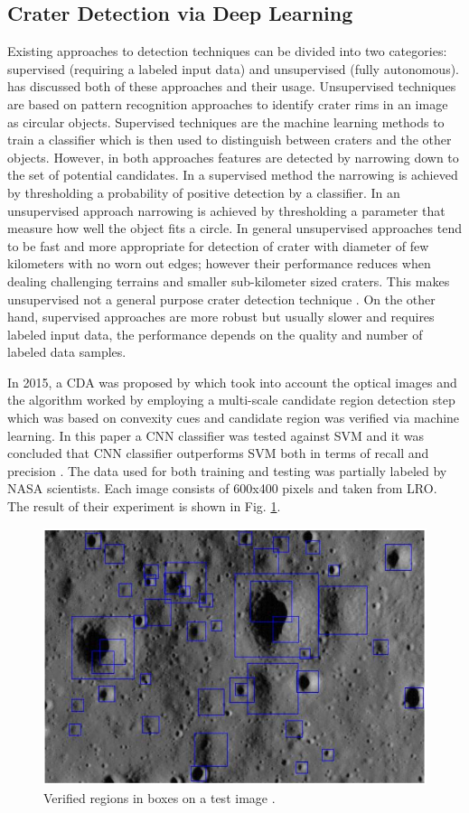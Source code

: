 \documentclass[11pt]{article}
\begin{document}
\subsection{Crater Detection via Deep Learning}
Existing approaches to detection techniques can be divided into two categories: supervised (requiring a labeled input data) and unsupervised (fully autonomous). \cite{stepinski2009machine} has discussed both of these approaches and their usage. Unsupervised techniques are based on pattern recognition approaches to identify crater rims in an image as circular objects. Supervised techniques are the machine learning methods to train a classifier which is then used to distinguish between craters and the other objects. However, in both approaches features are detected by narrowing down to the set of potential candidates. In a supervised method the narrowing is achieved by thresholding a probability of positive detection by a classifier. In an unsupervised approach narrowing is achieved by thresholding a parameter that measure how well the object fits a circle. In general unsupervised approaches tend to be fast and more appropriate for detection of crater with diameter of few kilometers with no worn out edges; however their performance reduces when dealing challenging terrains and smaller sub-kilometer sized craters. This makes unsupervised not a general purpose crater detection technique \cite{emami2015automatic}. On the other hand, supervised approaches are more robust but usually slower and requires labeled input data, the performance depends on the quality and number of labeled data samples.

In 2015, a CDA was proposed by \cite{emami2015automatic} which took into account the optical images and the algorithm worked by employing a multi-scale candidate region detection step which was based on convexity cues and candidate region was verified via machine learning. In this paper a CNN classifier was tested against SVM and it was concluded that CNN classifier outperforms SVM both in terms of recall and precision \cite{emami2015automatic}. The data used for both training and testing was partially labeled by NASA scientists. Each image consists of 600x400 pixels and taken from LRO. The result of their experiment is shown in Fig. \ref{cnn_class}.

\begin{figure}[ht!]
	\centering
	\includegraphics[width=.6\textwidth]{files/literature/emami.png}
	\caption{Verified regions in boxes on a test image \cite{wetzler2005learning}.}
	\label{cnn_class}
\end{figure}
\end{document}
